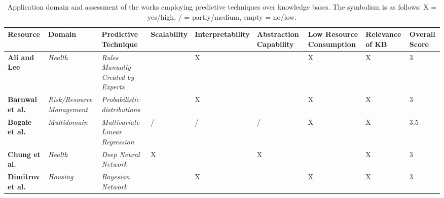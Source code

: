\begin{table}[H]
\caption{Application domain and assessment of the works employing predictive techniques over knowledge bases. 
The symbolism is as follows: X = yes/high, / = partly/medium, empty = no/low. \label{tab:reasoning}}
\centering
\tablesize{\scriptsize} 
\begin{tabular}{C{2.5cm}C{2cm}C{2cm}C{2cm}C{2cm}C{1.5cm}C{1.5cm}C{1.5cm}C{1.5cm}}
\toprule
{\textbf{Resource}} &
{\textbf{Domain}} &
\textbf{Predictive} \textbf{Technique} &
{\textbf{Scalability}} &
{\textbf{Interpretability}} &
\textbf{Abstraction} \textbf{Capability} &
\textbf{Low Resource} \textbf{Consumption} &
\textbf{Relevance} \textbf{of KB} &
\textbf{Overall} \textbf{Score} \\
\midrule
\textbf{Ali and Lee} \citep{aliandlee}         & \textit{Health}                   & \textit{Rules Manually Created by Experts}                           &                      & X                         &                                 & X                                 & X                        & 3                      \\
\textbf{Barnwal et al.} \citep{barnwaletal}      & \textit{Risk/Resource Management} & \textit{Probabilistic distributions}                                 &                      & X                         &                                 & X                                 & X                        & 3                      \\ 
\textbf{Bogale et al.} \citep{bogaleetal}       & \textit{Multidomain}              & \textit{Multivariate Linear Regression}                              & /                    & /                         & /                               & X                                 & X                        & 3.5                    \\ 
\textbf{Chung et al.} \citep{chungetal2018}        & \textit{Health}                   & \textit{Deep Neural Network}                                         & X                    &                           & X                               &                                   & X                        & 3                      \\
\textbf{Dimitrov et al.} \citep{dimitrovetal}     & \textit{Housing}                  & \textit{Bayesian Network} \citep{bayesiannetwork}                                             &                      & X                         &                                 & X                                 & X                        & 3                      \\ 

\end{tabular}
\end{table}
